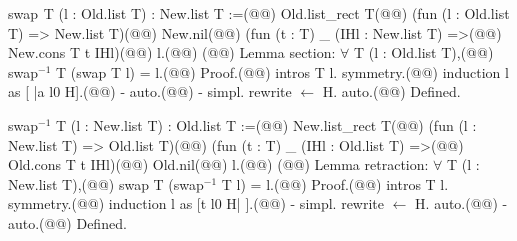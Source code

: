 swap$\phantom{^{2}}$T (l : Old.list T) : New.list T :=(@\vspace{-0.04cm}@)
  Old.list_rect T(@\vspace{-0.04cm}@)
    (fun (l : Old.list T) => New.list T)(@\vspace{-0.04cm}@)
    New.nil(@\vspace{-0.04cm}@)
    (fun (t : T) _ (IHl : New.list T) =>(@\vspace{-0.04cm}@)
      New.cons T t IHl)(@\vspace{-0.04cm}@)
    l.(@\vspace{-0.04cm}@)
(@\vspace{-0.04cm}@)
Lemma section: $\forall$ T (l : Old.list T),(@\vspace{-0.04cm}@)
  swap$^{-1}$ T (swap T l) = l.(@\vspace{-0.04cm}@)
Proof.(@\vspace{-0.04cm}@)
  intros T l. symmetry.(@\vspace{-0.04cm}@)
  induction l as [ |a l0 H].(@\vspace{-0.04cm}@)
  - auto.(@\vspace{-0.04cm}@)
  - simpl. rewrite $\leftarrow$ H. auto.(@\vspace{-0.04cm}@)
Defined.

swap$^{-1}$ T (l : New.list T) : Old.list T :=(@\vspace{-0.04cm}@)
  New.list_rect T(@\vspace{-0.04cm}@)
    (fun (l : New.list T) => Old.list T)(@\vspace{-0.04cm}@)
    (fun (t : T) _ (IHl : Old.list T) =>(@\vspace{-0.04cm}@)
      Old.cons T t IHl)(@\vspace{-0.04cm}@)
    Old.nil(@\vspace{-0.04cm}@)
    l.(@\vspace{-0.04cm}@)
(@\vspace{-0.04cm}@)
Lemma retraction: $\forall$ T (l : New.list T),(@\vspace{-0.04cm}@)
  swap T (swap$^{-1}$ T l) = l.(@\vspace{-0.04cm}@)
Proof.(@\vspace{-0.04cm}@)
  intros T l. symmetry.(@\vspace{-0.04cm}@)
  induction l as [t l0 H| ].(@\vspace{-0.04cm}@)
  - simpl. rewrite $\leftarrow$ H. auto.(@\vspace{-0.04cm}@)
  - auto.(@\vspace{-0.04cm}@)
Defined.
